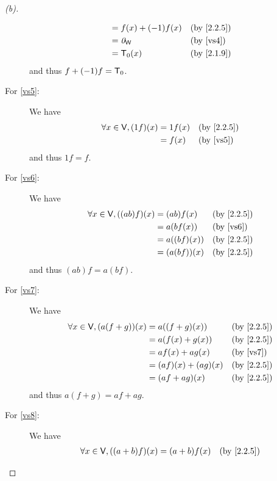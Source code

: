\begin{proof}[(b)]
\begin{description}
\begin{align*}
                                           & = f(x) + (-1)f(x)   &  & \text{(by \cref{2.2.5})} \\
                                           & = \zv_{\W}          &  & \text{(by \ref{vs4})}    \\
                                           & = \zT(x)            &  & \text{(by \cref{2.1.9})}
      \end{align*}
      and thus \(f + (-1)f = \mathsf{T}_0\).
    \item[For \ref{vs5}:] We have
      \begin{align*}
        \forall x \in \V, (1f)(x) & = 1f(x) &  & \text{(by \cref{2.2.5})} \\
                                  & = f(x)  &  & \text{(by \ref{vs5})}
      \end{align*}
      and thus \(1f = f\).
    \item[For \ref{vs6}:] We have
      \begin{align*}
        \forall x \in \V, ((ab)f)(x) & = (ab) f(x)   &  & \text{(by \cref{2.2.5})} \\
                                     & = a (bf(x))   &  & \text{(by \ref{vs6})}    \\
                                     & = a ((bf)(x)) &  & \text{(by \cref{2.2.5})} \\
                                     & = (a (bf))(x) &  & \text{(by \cref{2.2.5})}
      \end{align*}
      and thus \((ab)f = a (bf)\).
    \item[For \ref{vs7}:] We have
      \begin{align*}
        \forall x \in \V, (a(f + g))(x) & = a((f + g)(x))     &  & \text{(by \cref{2.2.5})} \\
                                        & = a(f(x) + g(x))    &  & \text{(by \cref{2.2.5})} \\
                                        & = af(x) + ag(x)     &  & \text{(by \ref{vs7})}    \\
                                        & = (af)(x) + (ag)(x) &  & \text{(by \cref{2.2.5})} \\
                                        & = (af + ag)(x)      &  & \text{(by \cref{2.2.5})}
      \end{align*}
      and thus \(a(f + g) = af + ag\).
    \item[For \ref{vs8}:] We have
      \begin{align*}
        \forall x \in \V, ((a + b)f)(x) & = (a + b) f(x)      &  & \text{(by \cref{2.2.5})} \\

\end{align*}
\end{description}
\end{proof}
